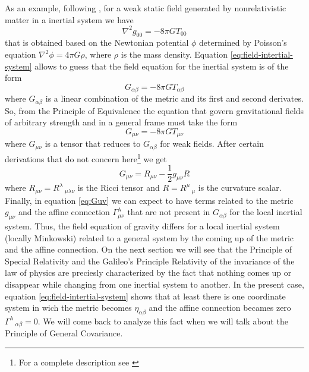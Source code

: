 \documentclass[10pt, letterpaper, oneside]{book}
\theoremstyle{theorem} %
\theoremstyle{theorem} %
\theoremstyle{definition}
\theoremstyle{remark}
\theoremstyle{definition}
\theoremstyle{definition}
\theoremstyle{theorem}
\begin{document}
As an example, following \cite{weinberg}, for a weak static field generated by nonrelativistic matter in a inertial system we have
\begin{equation}
	\nabla^2g_{00}=-8\pi GT_{00} \label{eq:field-intertial-system}
\end{equation}
that is obtained based on the Newtonian potential $\phi$ determined by Poisson's equation ${\nabla^2 \phi = 4\pi G \rho}$, where $\rho$ is the mass density. Equation \ref{eq:field-intertial-system} allows to guess that the field equation for the inertial system is of the form
\begin{equation}
	G_{\alpha\beta} = -8\pi GT_{\alpha\beta}
\end{equation}
where $G_{\alpha\beta}$ is a linear combination of the metric and its first and second derivates. So, from the Principle of Equivalence the equation that govern gravitational fields of arbitrary strength and in a general frame must take the form
\begin{equation}
	G_{\mu\nu} = -8\pi GT_{\mu\nu}
\end{equation}
where $G_{\mu\nu}$ is a tensor that reduces to $G_{\alpha\beta}$ for weak fields. After certain derivations that do not concern here\footnote{For a complete description see \cite{weinberg}} we get
\begin{equation}
	G_{\mu\nu} = R_{\mu\nu}-\frac{1}{2}g_{\mu\nu}R \label{eq:Guv}
\end{equation}
where $R_{\mu\nu}=R^\lambda\,_{\mu\lambda\nu}$ is the Ricci tensor and $R=R^\mu\,_\mu$ is the curvature scalar. Finally, in equation \ref{eq:Guv} we can expect to have terms related to the metric $g_{\mu\nu}$ and the affine connection $\Gamma^\lambda_{\mu\nu}$ that are not present in $G_{\alpha\beta}$ for the local inertial system. Thus, the field equation of gravity differs for a local inertial system (locally Minkowski) related to a general system by the coming up of the metric and the affine connection. On the next section we will see that the Principle of Special Relativity and the Galileo's Principle Relativity of the invariance of the law of physics are preciesly characterized by the fact that nothing comes up or disappear while changing from one inertial system to another. In the present case, equation \ref{eq:field-intertial-system} shows that at least there is one coordinate system in wich the metric becomes $\eta_{\alpha\beta}$ and the affine connection becames zero $\Gamma^\lambda\,_{\alpha\beta}=0$. We will come back to analyze this fact when we will talk about the Principle of General Covariance.
\end{document}
